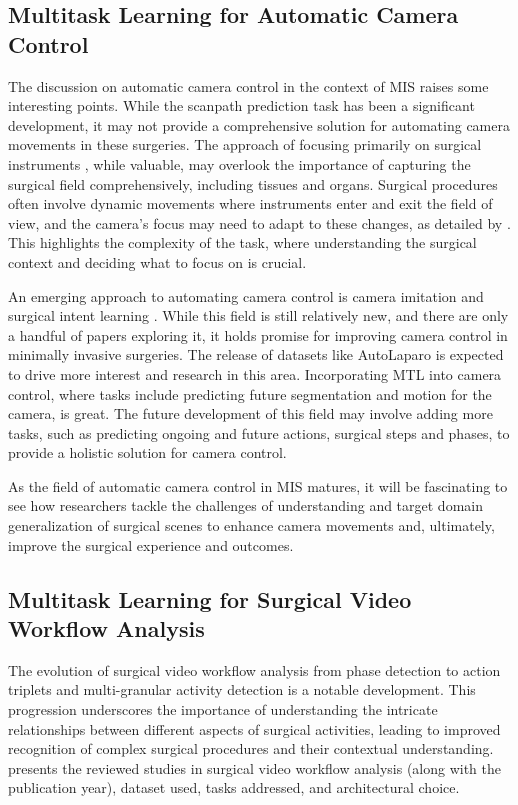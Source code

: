 \subsection{Multitask Learning for Automatic Camera Control}
The discussion on automatic camera control in the context of MIS raises some interesting points. While the scanpath prediction task has been a significant development, it may not provide a comprehensive solution for automating camera movements in these surgeries. The approach of focusing primarily on surgical instruments \citep{learning_look_tracking,Islam2020_ST_MTL}, while valuable, may overlook the importance of capturing the surgical field comprehensively, including tissues and organs. Surgical procedures often involve dynamic movements where instruments enter and exit the field of view, and the camera's focus may need to adapt to these changes, as detailed by \citet{prostatectomy_video}. This highlights the complexity of the task, where understanding the surgical context and deciding what to focus on is crucial.

An emerging approach to automating camera control is camera imitation and surgical intent learning \citep{10.1007/978-3-031-43996-4_21,multi_fov}. While this field is still relatively new, and there are only a handful of papers exploring it, it holds promise for improving camera control in minimally invasive surgeries. The release of datasets like AutoLaparo is expected to drive more interest and research in this area. Incorporating MTL into camera control, where tasks include predicting future segmentation and motion for the camera, is great. The future development of this field may involve adding more tasks, such as predicting ongoing and future actions, surgical steps and phases, to provide a holistic solution for camera control.


As the field of automatic camera control in MIS matures, it will be fascinating to see how researchers tackle the challenges of understanding and target domain generalization of surgical scenes to enhance camera movements and, ultimately, improve the surgical experience and outcomes.


\subsection{Multitask Learning for Surgical Video Workflow Analysis}
\label{sec:review-workflow-discussion}

The evolution of  surgical video workflow analysis from phase detection to action triplets and multi-granular activity detection is a notable development. This progression underscores the importance of understanding the intricate relationships between different aspects of surgical activities, leading to improved recognition of complex surgical procedures and their contextual understanding.  presents the reviewed studies in surgical video workflow analysis (along with the publication year), dataset used, tasks addressed, and architectural choice.


